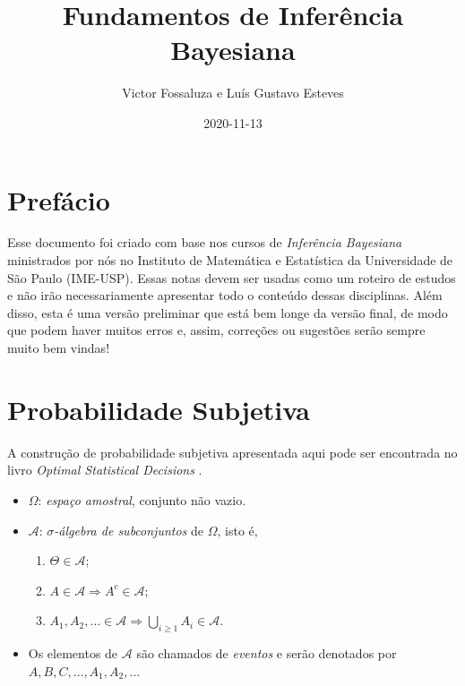 \documentclass[
]{book}
\title{Fundamentos de Inferência Bayesiana}
\author{Victor Fossaluza e Luís Gustavo Esteves}
\date{2020-11-13}
\providecommand{\tightlist}{%
  \setlength{\itemsep}{0pt}\setlength{\parskip}{0pt}}
\begin{document}
\maketitle

{
\setcounter{tocdepth}{1}
\tableofcontents
}
\hypertarget{prefuxe1cio}{%
\chapter{Prefácio}\label{prefuxe1cio}}

Esse documento foi criado com base nos cursos de \emph{Inferência Bayesiana} ministrados por nós no Instituto de Matemática e Estatística da Universidade de São Paulo (IME-USP). Essas notas devem ser usadas como um roteiro de estudos e não irão necessariamente apresentar todo o conteúdo dessas disciplinas. Além disso, esta é uma versão preliminar que está bem longe da versão final, de modo que podem haver muitos erros e, assim, correções ou sugestões serão sempre muito bem vindas!

\hypertarget{ProbSubj}{%
\chapter{Probabilidade Subjetiva}\label{ProbSubj}}

A construção de probabilidade subjetiva apresentada aqui pode ser encontrada no livro \emph{Optimal Statistical Decisions} \citep{DeGroot70}.

\begin{itemize}
\item
  \(\Omega\): \emph{espaço amostral}, conjunto não vazio.
\item
  \(\mathcal{A}\): \emph{\(\sigma\)-álgebra de subconjuntos} de \(\Omega\), isto é,

  \begin{enumerate}
  \def\labelenumi{\arabic{enumi}.}
  \tightlist
  \item
    \(\Theta \in \mathcal{A}\);
  \item
    \(A \in \mathcal{A} \Longrightarrow A^{c} \in \mathcal{A}\);
  \item
    \(\displaystyle A_1, A_2, \ldots \in \mathcal{A} \Longrightarrow \bigcup_{i\geq1} A_i \in \mathcal{A}\).
  \end{enumerate}
\item
  Os elementos de \(\mathcal{A}\) são chamados de \emph{eventos} e serão denotados por \(A, B, C, \ldots, A_1, A_2, \ldots\)
\end{itemize}
\end{document}

